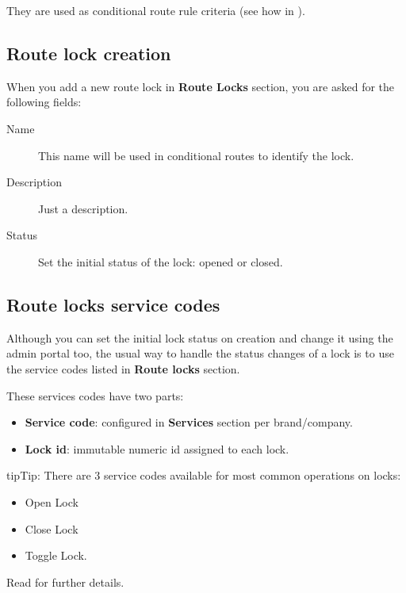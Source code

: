 \documentclass[letterpaper,10pt,english]{sphinxmanual}
\begin{document}
They are used as conditional route rule criteria (see how in {\hyperref[pbx_features/conditional_routes:conditional\string-routes]{}}).


\subsection{Route lock creation}
\label{pbx_features/route_locks:route-lock-creation}
When you add a new route lock in \textbf{Route Locks} section, you are asked for the following fields:
\begin{description}
\item[{Name}] \leavevmode{}\label{pbx_features/route_locks:term-name}
This name will be used in conditional routes to identify the lock.

\item[{Description}] \leavevmode{}\label{pbx_features/route_locks:term-description}
Just a description.

\item[{Status}] \leavevmode{}\label{pbx_features/route_locks:term-status}
Set the initial status of the lock: opened or closed.

\end{description}


\subsection{Route locks service codes}
\label{pbx_features/route_locks:route-locks-service-codes}
Although you can set the initial lock status on creation and change it using the admin portal too, the usual way to
handle the status changes of a lock is to use the service codes listed in \textbf{Route locks} section.

These services codes have two parts:
\begin{itemize}
\item {} 
\textbf{Service code}: configured in \textbf{Services} section per brand/company.

\item {} 
\textbf{Lock id}: immutable numeric id assigned to each lock.

\end{itemize}

\begin{notice}{tip}{Tip:}
There are 3 service codes available for most common operations on locks:
\begin{itemize}
\item {} 
Open Lock

\item {} 
Close Lock

\item {} 
Toggle Lock.

\end{itemize}

Read {\hyperref[pbx_features/services:services]{}} for further details.
\end{notice}
\end{document}
